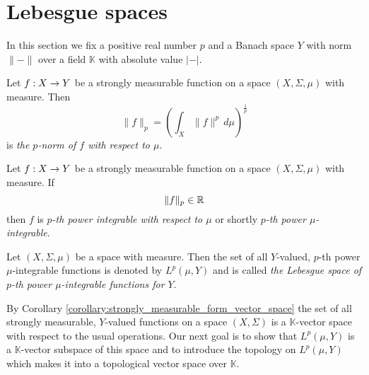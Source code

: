 \section{Lebesgue spaces}\label{section:lebesgue_spaces}
\noindent
In this section we fix a positive real number $p$ and a Banach space $Y$ with norm $\lVert-\rVert$ over a field $\mathbb{K}$ with absolute value $|-|$.

\begin{definition}
    Let $f:X\rightarrow Y$ be a strongly measurable function on a space $(X,\Sigma,\mu)$ with measure. Then
    $$\lVert f\rVert_p = \left(\int_X\lVert f\rVert^p\,d\mu\right)^{\frac{1}{p}}$$
    is \textit{the $p$-norm of $f$ with respect to $\mu$}.
\end{definition}

\begin{definition}
    Let $f:X\rightarrow Y$ be a strongly measurable function on a space $(X,\Sigma,\mu)$ with measure. If
    $$\lVert f\rVert_p \in {\mathbb R}$$
    then $f$ is \textit{$p$-th power integrable with respect to $\mu$} or shortly \textit{$p$-th power $\mu$-integrable}.
\end{definition}

\begin{definition}
    Let $(X,\Sigma,\mu)$ be a space with measure. Then the set of all $Y$-valued, $p$-th power $\mu$-integrable functions is denoted by $L^p(\mu,Y)$ and is called \textit{the Lebesgue space of $p$-th power $\mu$-integrable functions for $Y$}.
\end{definition}
\noindent
By Corollary \ref{corollary:strongly_measurable_form_vector_space} the set of all strongly measurable, $Y$-valued functions on a space $(X,\Sigma)$ is a $\mathbb{K}$-vector space with respect to the usual operations. Our next goal is to show that $L^p(\mu,Y)$ is a $\mathbb{K}$-vector subspace of this space and to introduce the topology on $L^p(\mu,Y)$ which makes it into a topological vector space over $\mathbb{K}$.


